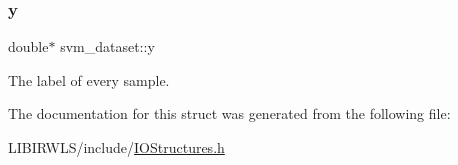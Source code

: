 \subsubsection{\texorpdfstring{y}{y}}
{\ttfamily double$\ast$ svm\+\_\+dataset\+::y}

The label of every sample. 

The documentation for this struct was generated from the following file\+:\begin{DoxyCompactItemize}
\item 
L\+I\+B\+I\+R\+W\+L\+S/include/\hyperlink{IOStructures_8h}{I\+O\+Structures.\+h}\end{DoxyCompactItemize}
